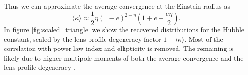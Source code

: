 Thus we can approximate the average convergence at the Einstein radius as 
\begin{equation}
\langle \kappa \rangle \approx \frac{1}{2} \eta  (1 - e)^{2 - \eta} \left(1 +  e - \frac{e \eta }{2}\right).
\end{equation}
In figure \ref{fig:scaled_triangle} we show the recovered distributions for the Hubble constant, scaled by the lens profile degeneracy factor $1 - \langle \kappa \rangle$. Most of the correlation with power law index and ellipticity is removed. The remaining is likely due to higher multipole moments of both the average convergence and the lens profile degeneracy \citep{Kochanek02}. 